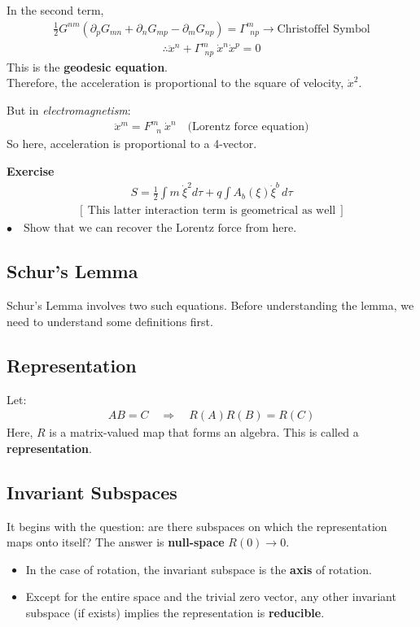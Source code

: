 \documentclass[14pt]{article} %
\begin{document}
In the second term,
\begin{align*}
\frac{1}{2}G^{nm} \left( \partial_p G_{mn} + \partial_n G_{mp} - \partial_m G_{np} \right) = \Gamma^m_{~~np} \rightarrow \text{Christoffel Symbol}
\end{align*}
\begin{align*}
\boxed{\therefore \ddot{x}^n + \Gamma^m_{~~np}~ \dot{x}^n \dot{x}^p = 0}
\end{align*}
This is the \textbf{geodesic equation}.\\

\noindent
Therefore, the acceleration is proportional to the square of velocity, $\dot{x}^2$.

But in \textit{electromagnetism}:
\begin{align*}
\ddot{x}^m = F^m_{~~~n}~\dot{x}^n \quad \text{(Lorentz force equation)}
\end{align*}
So here, acceleration is proportional to a 4-vector.
\begin{framed}
\noindent
\textbf{Exercise}
\begin{align*}
S = \frac{1}{2} \int m~ \dot{\xi}^2 d\tau + q \int A_b(\xi) \dot{\xi}^b \, d\tau
\end{align*}
\begin{align*}
\left[~\text{This latter interaction term is geometrical as well}~\right]
\end{align*}
$\bullet \quad\text{Show that we can recover the Lorentz force from here.}$
\end{framed}
\subsection{Schur's Lemma}
Schur's Lemma involves two such equations. Before understanding the lemma, we need to understand some definitions first.

\subsection*{Representation}
Let:
\begin{align*}
AB = C \quad\Rightarrow \quad R(A)R(B) = R(C)
\end{align*}
Here, $R$ is a matrix-valued map that forms an algebra. This is called a \textbf{representation}.

\subsection*{Invariant Subspaces}
It begins with the question: are there subspaces on which the representation maps onto itself? The answer is \textbf{null-space} $R(0) \rightarrow 0$.
\begin{itemize}
    \item In the case of rotation, the invariant subspace is the \textbf{axis} of rotation.
    \item Except for the entire space and the trivial zero vector, any other invariant subspace (if exists) implies the representation is \textbf{reducible}.
\end{itemize}
\end{document}
